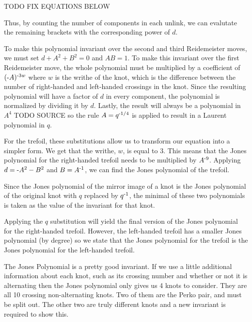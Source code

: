\begin{paper}
TODO FIX EQUATIONS BELOW


Thus, by counting the number of components in each unlink, we can evalutate the
remaining brackets with the corresponding power of $d$.


To make this polynomial invariant over the second and third Reidemeister moves,
we must set $d+A^2+B^2=0$ and $AB=1$.
To make this invariant over the first Reidemeister move, the whole polynomial
must be multiplied by a coefficient of $(\text-A)^{\text-3w}$ where $w$ is the
writhe of the knot, which is the difference between the number of right-handed
and left-handed crossings in the knot.
Since the resulting polynomial will have a factor of $d$ in every component, the
polynomial is normalized by dividing it by $d$.
Lastly, the result will always be a polynomial in $A^4$ TODO SOURCE so the rule
$A=q^{\text-1/4}$ is applied to result in a Laurent polynomial in $q$.

For the trefoil, these substitutions allow us to transform our equation into a
simpler form.
We get that the writhe, $w$, is equal to 3.
This means that the Jones polynomial for the right-handed trefoil needs to be
multiplied by $A^{\text-9}$.
Applying $d=\text-A^2-B^2$ and $B=A^{\text-1}$, we can find the Jones polynomial
of the trefoil.


Since the Jones polynomial of the mirror image of a knot is the Jones polynomial
of the original knot with $q$ replaced by $q^{\text-1}$, the minimal of these two
polynomials is taken as the value of the invariant for that knot.

Applying the $q$ substitution will yield the final version of the Jones
polynomial for the right-handed trefoil.
However, the left-handed trefoil has a smaller Jones polynomial (by degree) so
we state that the Jones polynomial for the trefoil is the Jones polynomial for
the left-handed trefoil.



The Jones Polynomial is a pretty good invariant.
If we use a little additional information about each knot, such as its crossing
number and whether or not it is alternating then the Jones polynomial only gives
us 4 knots to consider.
They are all 10 crossing non-alternating knots.
Two of them are the Perko pair, and must be split out.
The other two are truly different knots and a new invariant is required to show
this.


\end{paper}
